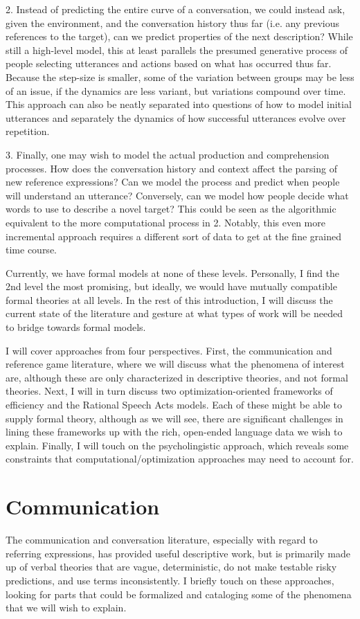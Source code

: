 \documentclass[]{article}
\begin{document}
	2. Instead of predicting the entire curve of a conversation, we could instead ask, given the environment, and the conversation history thus far (i.e. any previous references to the target), can we predict properties of the next description? While still a high-level model, this at least parallels the presumed generative process of people selecting utterances and actions based on what has occurred thus far. Because the step-size is smaller, some of the variation between groups may be less of an issue, if the dynamics are less variant, but variations compound over time. This approach can also be neatly separated into questions of how to model initial utterances and separately the dynamics of how successful utterances evolve over repetition. 
	
	3. Finally, one may wish to model the actual production and comprehension processes. How does the conversation history and context affect the parsing of new reference expressions? Can we model the process and predict when people will understand an utterance? Conversely, can we model how people decide what words to use to describe a novel target? This could be seen as the algorithmic equivalent to the more computational process in 2. Notably, this even more incremental approach requires a different sort of data to get at the fine grained time course. 
	
	Currently, we have formal models at none of these levels. Personally, I find the 2nd level the most promising, but ideally, we would have mutually compatible formal theories at all levels. In the rest of this introduction, I will discuss the current state of the literature and gesture at what types of work will be needed to bridge towards formal models. 
	
	I will cover approaches from four perspectives. First, the communication and reference game literature, where we will discuss what the phenomena of interest are, although these are only characterized in descriptive theories, and not formal theories. Next, I will in turn discuss two optimization-oriented frameworks of efficiency and the Rational Speech Acts models. Each of these might be able to supply formal theory, although as we will see, there are significant challenges in lining these frameworks up with the rich, open-ended language data we wish to explain. Finally, I will touch on the psycholingistic approach, which reveals some constraints that computational/optimization approaches may need to account for. 
	

\section{Communication}
The communication and conversation literature, especially with regard to referring expressions, has provided useful descriptive work, but is primarily made up of verbal theories that are vague, deterministic, do not make testable risky predictions, and use terms inconsistently. I briefly touch on these approaches, looking for parts that could be formalized and cataloging some of the phenomena that we will wish to explain. 
\end{document}
